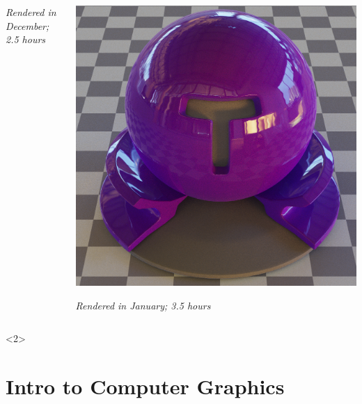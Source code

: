 \documentclass{beamer}
\begin{document}
\begin{frame}
{\begin{columns}[T]
\begin{column}{0.5\textwidth}
				\textit{Rendered in December; 2.5 hours}
			\end{column}
			\begin{column}{0.5\textwidth}
				\centering
				\includegraphics[width=\textwidth]{media/material_sqr.png}
	
				\textit{Rendered in January; 3.5 hours}
			\end{column}
		\end{columns}
	}<2>
	
\end{frame}

\section{Intro to Computer Graphics}
\end{document}
